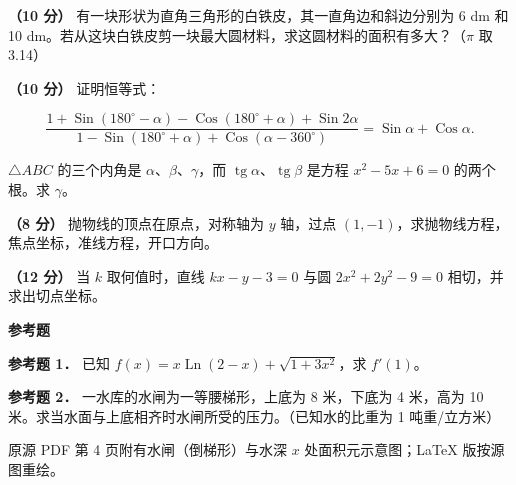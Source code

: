 \begin{question}
\textbf{（10 分）} 有一块形状为直角三角形的白铁皮，其一直角边和斜边分别为 6 dm 和 10 dm。若从这块白铁皮剪一块最大圆材料，求这圆材料的面积有多大？（$\pi$ 取 3.14）

\end{question}
\begin{question}
\textbf{（10 分）} 证明恒等式：

\nopagebreak[4]
\[
\frac{1+\operatorname{Sin}(180^\circ-\alpha)-\operatorname{Cos}(180^\circ+\alpha)+\operatorname{Sin}2\alpha}
{1-\operatorname{Sin}(180^\circ+\alpha)+\operatorname{Cos}(\alpha-360^\circ)}
=\operatorname{Sin}\alpha+\operatorname{Cos}\alpha.
\]

\end{question}
\begin{question}
$\triangle ABC$ 的三个内角是 $\alpha\text{、}\beta\text{、}\gamma$，而 $\operatorname{tg}\alpha\text{、}\operatorname{tg}\beta$ 是方程 $x^2-5x+6=0$ 的两个根。求 $\gamma$。

\end{question}
\begin{question}
\textbf{（8 分）} 抛物线的顶点在原点，对称轴为 $y$ 轴，过点 $(1,-1)$，求抛物线方程，焦点坐标，准线方程，开口方向。

\Needspace{0.4\textheight}
\end{question}
\begin{question}
\textbf{（12 分）} 当 $k$ 取何值时，直线 $kx-y-3=0$ 与圆 $2x^2+2y^2-9=0$ 相切，并求出切点坐标。

\begin{gktip}
\textbf{参考题}
\end{gktip}

\textbf{参考题 1．} 已知 $f(x)=x\operatorname{Ln}(2-x)+\sqrt{1+3x^2}$，求 $f'(1)$。

\textbf{参考题 2．} 一水库的水闸为一等腰梯形，上底为 8 米，下底为 4 米，高为 10 米。求当水面与上底相齐时水闸所受的压力。（已知水的比重为 1 吨重/立方米）

\begin{gktip}
原源 PDF 第 4 页附有水闸（倒梯形）与水深 $x$ 处面积元示意图；LaTeX 版按源图重绘。
\end{gktip}
\nopagebreak[4]
\begin{center}\end{center}
\nopagebreak[4]

\end{question}